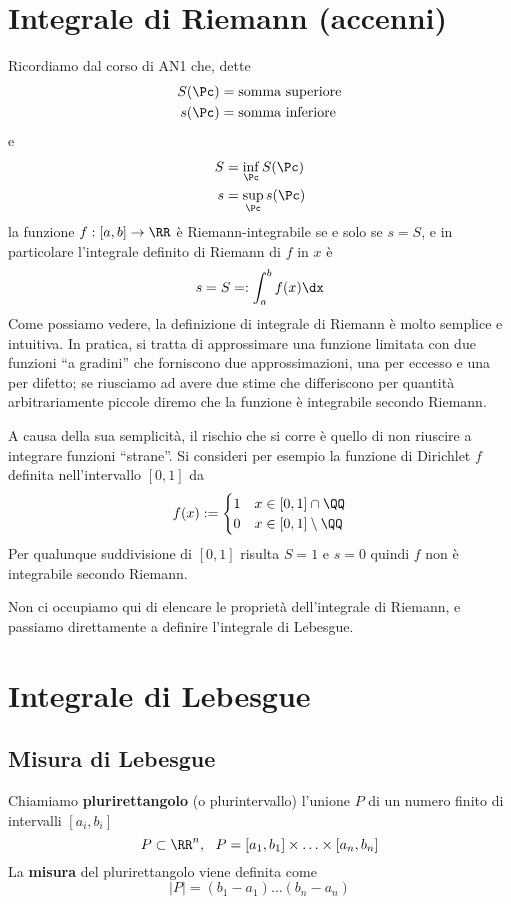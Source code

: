\section{Integrale di Riemann (accenni)}

Ricordiamo dal corso di AN1 che, dette 
\begin{align*}
S(\Pc)&=\text{somma superiore}\\
s(\Pc)&=\text{somma inferiore}
\end{align*}
e
\begin{align*}
S&=\inf_{\Pc}S(\Pc) \\
s&=\sup_{\Pc}s(\Pc)
\end{align*}
la funzione $f:[a,b]\to\RR$ è Riemann-integrabile se e solo se $s=S$, e in particolare l'integrale definito di Riemann di $f$ in $x$ è
\begin{equation*}
s=S=:\int_{a}^{b}f(x)\dx
\end{equation*}
Come possiamo vedere, la definizione di integrale di Riemann è molto semplice e intuitiva. In pratica, si tratta di approssimare una funzione limitata con due funzioni ``a gradini'' che forniscono due approssimazioni, una per eccesso e una per difetto; se riusciamo ad avere due stime che differiscono per quantità arbitrariamente piccole diremo che la funzione è integrabile secondo Riemann.

A causa della sua semplicità, il rischio che si corre è quello di non riuscire a integrare funzioni ``strane''. Si consideri per esempio la funzione di Dirichlet $f$ definita nell'intervallo $[0,1]$ da
\begin{equation*}
f(x):=\begin{cases}
1 &x\in[0,1]\cap\QQ \\
0 &x\in[0,1]\setminus\QQ
\end{cases}
\end{equation*}
Per qualunque suddivisione di $[0,1]$ risulta $S=1$ e $s=0$ quindi $f$ non è integrabile secondo Riemann.

Non ci occupiamo qui di elencare le proprietà dell'integrale di Riemann, e passiamo direttamente a definire l'integrale di Lebesgue.

\section{Integrale di Lebesgue}

\subsection{Misura di Lebesgue}
Chiamiamo \textbf{plurirettangolo} (o plurintervallo) l'unione $P$ di un numero finito di intervalli $[a_i,b_i]$
\begin{equation*}
P\subset \RR^{n}, \ \ P = [a_{1}, b_{1}] \times \dotsc \times [a_{n}, b_{n}]
\end{equation*}
La \textbf{misura} del plurirettangolo viene definita come
\begin{equation*}
|P| = (b_{1} - a_{1}) \dotsc (b_{n} - a_{n})
\end{equation*}

